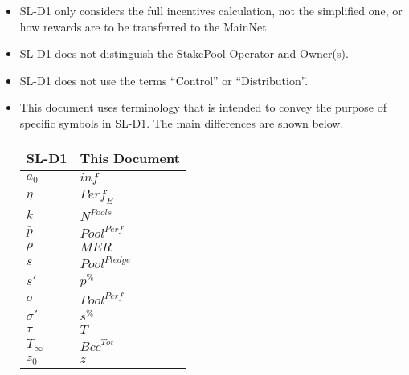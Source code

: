 \documentclass[11pt,a4paper,dvipsnames,twosided,final]{article}
\begin{document}
\begin{itemize}
\item
  SL-D1 only considers the full incentives calculation, not the simplified one, or how
  rewards are to be transferred to the MainNet.
\item
  SL-D1 does not distinguish the StakePool Operator and Owner(s).
\item
  SL-D1 does not use the terms ``Control'' or ``Distribution''.
\item
  This document uses terminology that is intended to convey the purpose of specific symbols
  in SL-D1.  The main differences are shown below.

  \begin{center}
  \begin{tabular}{||l|l||}\hline\hline
    \textbf{SL-D1} & \textbf{This Document} \\ \hline
  $a_0$ & $\textit{inf}$ \\ \hline
  $\eta$ & $\textit{Perf}_E$ \\ \hline
  $k$ & $N^{\textit{Pools}}$ \\ \hline
  $\bar{p}$  & $\textit{Pool}^{\textit{Perf}}$ \\ \hline
  $\rho$ & $\textit{MER}$ \\ \hline
  $s$  & $\textit{Pool}^{\textit{Pledge}}$ \\ \hline
  $s'$  & $\textit{p}^{\%}$ \\ \hline
  $\sigma$ & $\textit{Pool}^{\textit{Perf}}$ \\
  $\sigma'$  & $\textit{s}^{\%}$ \\ \hline
  $\tau$  & $T$ \\ \hline
  $T_{\infty}$  & $\textit{Bcc}^{Tot}$ \\ \hline
  $z_0$ & $z$ \\ \hline
\hline
\end{tabular}
\end{center}
\end{itemize}
\end{document}
